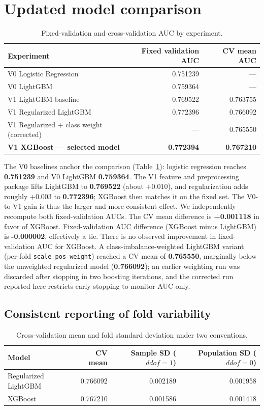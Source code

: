 \documentclass{article}
\begin{document}
\section{Updated model comparison}
\begin{table}[ht]
\centering
\small
\caption{Fixed-validation and cross-validation AUC by experiment.}
\label{tab:comparison}
\begin{tabular}{lrr}
\toprule
Experiment & Fixed validation AUC & CV mean AUC \\
\midrule
V0 Logistic Regression & 0.751239 & --- \\
V0 LightGBM & 0.759364 & --- \\
V1 LightGBM baseline & 0.769522 & 0.763755 \\
V1 Regularized LightGBM & 0.772396 & 0.766092 \\
V1 Regularized + class weight (corrected) & --- & 0.765550 \\
\textbf{V1 XGBoost --- selected model} & \textbf{0.772394} & \textbf{0.767210} \\
\bottomrule
\end{tabular}
\end{table}

The V0 baselines anchor the comparison (Table~\ref{tab:comparison}): logistic regression reaches \textbf{0.751239} and V0 LightGBM \textbf{0.759364}. The V1 feature and preprocessing package lifts LightGBM to \textbf{0.769522} (about $+0.010$), and regularization adds roughly $+0.003$ to \textbf{0.772396}; XGBoost then matches it on the fixed set. The V0-to-V1 gain is thus the larger and more consistent effect. We independently recompute both fixed-validation AUCs. The CV mean difference is \textbf{+0.001118} in favor of XGBoost. Fixed-validation AUC difference (XGBoost minus LightGBM) is \textbf{-0.000002}, effectively a tie. There is no observed improvement in fixed-validation AUC for XGBoost. A class-imbalance-weighted LightGBM variant (per-fold \texttt{scale\_pos\_weight}) reached a CV mean of \textbf{0.765550}, marginally below the unweighted regularized model (\textbf{0.766092}); an earlier weighting run was discarded after stopping in two boosting iterations, and the corrected run reported here restricts early stopping to monitor AUC only.

\subsection{Consistent reporting of fold variability}
\begin{table}[ht]
\centering
\small
\caption{Cross-validation mean and fold standard deviation under two conventions.}
\label{tab:variability}
\begin{tabular}{lrrr}
\toprule
Model & CV mean & Sample SD ($ddof{=}1$) & Population SD ($ddof{=}0$) \\
\midrule
Regularized LightGBM & 0.766092 & 0.002189 & 0.001958 \\
XGBoost & 0.767210 & 0.001586 & 0.001418 \\
\bottomrule
\end{tabular}
\end{table}
\end{document}
